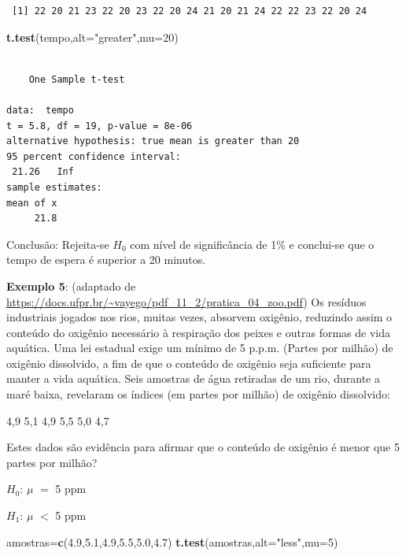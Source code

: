 \documentclass[12pt,brazil,oneside]{book}
\newenvironment{Shaded}{\begin{snugshade}}{\end{snugshade}}
\newcommand{\DataTypeTok}[1]{\textcolor[rgb]{0.13,0.29,0.53}{#1}}
\newcommand{\DecValTok}[1]{\textcolor[rgb]{0.00,0.00,0.81}{#1}}
\newcommand{\FloatTok}[1]{\textcolor[rgb]{0.00,0.00,0.81}{#1}}
\newcommand{\KeywordTok}[1]{\textcolor[rgb]{0.13,0.29,0.53}{\textbf{#1}}}
\newcommand{\NormalTok}[1]{#1}
\newcommand{\StringTok}[1]{\textcolor[rgb]{0.31,0.60,0.02}{#1}}
\begin{document}
\begin{verbatim}
 [1] 22 20 21 23 22 20 23 22 20 24 21 20 21 24 22 22 23 22 20 24
\end{verbatim}

\begin{Shaded}
\begin{Highlighting}[]
\KeywordTok{t.test}\NormalTok{(tempo,}\DataTypeTok{alt=}\StringTok{"greater"}\NormalTok{,}\DataTypeTok{mu=}\DecValTok{20}\NormalTok{)}
\end{Highlighting}
\end{Shaded}

\begin{verbatim}

    One Sample t-test

data:  tempo
t = 5.8, df = 19, p-value = 8e-06
alternative hypothesis: true mean is greater than 20
95 percent confidence interval:
 21.26   Inf
sample estimates:
mean of x 
     21.8 
\end{verbatim}

Conclusão: Rejeita-se \(H_0\) com nível de significância de 1\% e conclui-se que o tempo de espera é superior a 20 minutos.

\textbf{Exemplo 5}: (adaptado de \url{https://docs.ufpr.br/~vayego/pdf_11_2/pratica_04_zoo.pdf}) Os resíduos industriais jogados nos rios, muitas vezes, absorvem oxigênio, reduzindo assim o conteúdo do oxigênio necessário à respiração dos peixes e outras formas de vida aquática. Uma lei estadual exige um mínimo de 5 p.p.m. (Partes por milhão) de oxigênio dissolvido, a fim de que o conteúdo de oxigênio seja suficiente para manter a vida aquática. Seis amostras de água retiradas de um rio, durante a maré baixa, revelaram os índices (em partes por milhão) de oxigênio dissolvido:

4,9 5,1 4,9 5,5 5,0 4,7

Estes dados são evidência para afirmar que o conteúdo de oxigênio é menor que 5 partes por milhão?

\textbf{\(H_0\)}: \(\mu\) \(=\) 5 ppm

\textbf{\(H_1\)}: \(\mu\) \(<\) 5 ppm

\begin{Shaded}
\begin{Highlighting}[]
\NormalTok{amostras=}\KeywordTok{c}\NormalTok{(}\FloatTok{4.9}\NormalTok{,}\FloatTok{5.1}\NormalTok{,}\FloatTok{4.9}\NormalTok{,}\FloatTok{5.5}\NormalTok{,}\FloatTok{5.0}\NormalTok{,}\FloatTok{4.7}\NormalTok{)}
\KeywordTok{t.test}\NormalTok{(amostras,}\DataTypeTok{alt=}\StringTok{"less"}\NormalTok{,}\DataTypeTok{mu=}\DecValTok{5}\NormalTok{)}
\end{Highlighting}
\end{Shaded}
\end{document}
